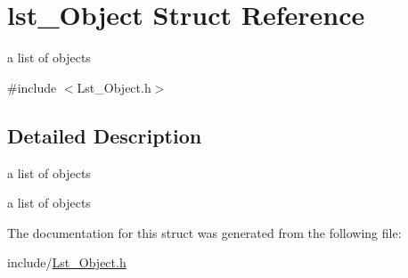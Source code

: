 \hypertarget{structlst___object}{}\section{lst\+\_\+\+Object Struct Reference}
\label{structlst___object}


a list of objects  




{\ttfamily \#include $<$Lst\+\_\+\+Object.\+h$>$}



\subsection{Detailed Description}
a list of objects 

a list of objects 

The documentation for this struct was generated from the following file\+:\begin{DoxyCompactItemize}
\item 
include/\hyperlink{_lst___object_8h}{Lst\+\_\+\+Object.\+h}\end{DoxyCompactItemize}
